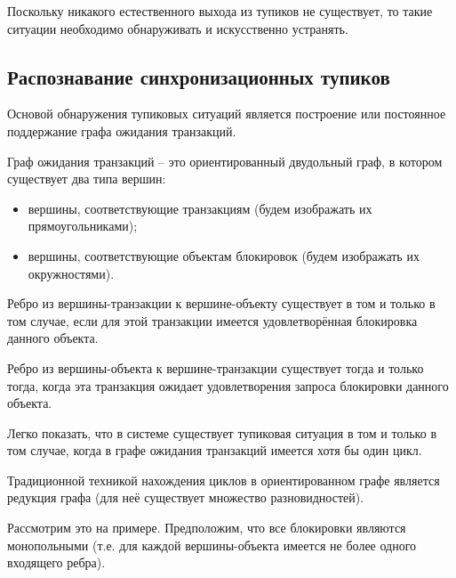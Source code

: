 \documentclass[a4paper,12pt]{article}
\begin{document}
Поскольку никакого естественного выхода из тупиков не существует, то такие ситуации необходимо обнаруживать и искусственно устранять.

\subsection{Распознавание синхронизационных тупиков}

Основой обнаружения тупиковых ситуаций является построение или постоянное поддержание графа ожидания транзакций.

Граф ожидания транзакций – это ориентированный двудольный граф, в котором существует два типа вершин:
\begin{itemize}
    \item вершины, соответствующие транзакциям (будем изображать их прямоугольниками);
    \item вершины, соответствующие объектам блокировок (будем изображать их окружностями).
\end{itemize}

Ребро из вершины-транзакции к вершине-объекту существует в том и только в том случае, если для этой транзакции имеется удовлетворённая блокировка данного объекта.

\begin{center}
\end{center}

Ребро из вершины-объекта к вершине-транзакции существует тогда и только тогда, когда эта транзакция ожидает удовлетворения запроса блокировки данного объекта.

Легко показать, что в системе существует тупиковая ситуация в том и только в том случае, когда в графе ожидания транзакций имеется хотя бы один цикл.

Традиционной техникой нахождения циклов в ориентированном графе является редукция графа (для неё существует множество разновидностей).

Рассмотрим это на примере. Предположим, что все блокировки являются монопольными (т.е. для каждой вершины-объекта имеется не более одного входящего ребра).
\end{document}
